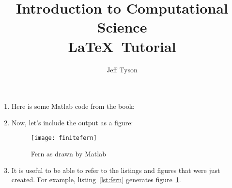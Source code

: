 \documentclass[11pt]{article}
\begin{document}
\title{Introduction to Computational Science\\
\LaTeX~Tutorial}

\author{Jeff Tyson}

\maketitle

\begin{enumerate}
  \item Here is some Matlab code from the book:
  
  
  \FloatBarrier
  
  \setcounter{enumi}{4}
  \item Now, let's include the output as a figure:
  \begin{figure}[H]
    \begin{center}
      \texttt{[image: finitefern]}
      \caption{Fern as drawn by Matlab}
      \label{fig:fern}
    \end{center}
  \end{figure}
  \FloatBarrier

  \setcounter{enumi}{12}
  \item It is useful to be able to refer to the listings and figures that were just created.
    For example, listing~\ref{lst:fern} generates figure~\ref{fig:fern}.
\end{enumerate}
\end{document}
